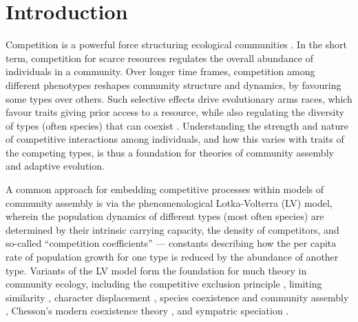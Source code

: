 \documentclass[a4paper,11pt]{article}
\begin{document}
\section{Introduction}

Competition is a powerful force structuring ecological communities \citep{Schluter-2000,Vellend-2016}. In the short term, competition for scarce resources regulates the overall abundance of individuals in a community. Over longer time frames, competition among different phenotypes reshapes community structure and dynamics, by favouring some types over others. Such selective effects drive evolutionary arms races, which favour traits giving prior access to a resource, while also regulating the diversity of types (often species) that can coexist \citep[e.g.][]{Gause-1934,Lack-1947,MacArthur-1967}. Understanding the strength and nature of competitive interactions among individuals, and how this varies with traits of the competing types, is thus a foundation for theories of community assembly and adaptive evolution.

A common approach for embedding competitive processes within models of community assembly is via the phenomenological Lotka-Volterra (LV) model, wherein the  population dynamics of different types (most often species) are determined by their intrinsic carrying capacity, the density of competitors, and so-called ``competition coefficients'' \citep{Lotka-1925, Volterra-1926} --- constants describing how the per capita rate of population growth for one type is reduced by the abundance of another type. Variants of the LV model form the foundation for much theory in community ecology, including the competitive exclusion principle \citep{Gause-1934}, limiting similarity \citep{MacArthur-1967, May-1972, Slatkin-1980, Abrams-1983}, character displacement \citep{Taper-1985, Case-2000}, species coexistence and community assembly \citep{MacArthur-1967, Calcagno-2006, Leimar-2013, DAndrea-2019}, Chesson's modern coexistence theory \citep{Chesson-2000,Barabas-2018}, and sympatric speciation \citep{Dieckmann-1999}.
\end{document}
